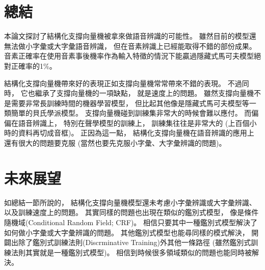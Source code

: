\section{總結}
  本論文探討了結構化支撐向量機被拿來做語音辨識的可能性。 
  雖然目前的模型還無法做小字彙或大字彙語音辨識，
  但在音素辨識上已經能取得不錯的部份成果。
  音素正確率在使用音素事後機率作為輸入特徵的情況下能贏過隱藏式馬可夫模型絕對正確率的1\%。

  結構化支撐向量機帶來好的表現正如支撐向量機常常帶來不錯的表現。
  不過同時，
  它也繼承了支撐向量機的一項缺點，
  就是速度上的問題。
  雖然支撐向量機不是需要非常長訓練時間的機器學習模型，
  但比起其他像是隱藏式馬可夫模型等一類簡單的貝氏學派模型。
  支撐向量機碰到訓練集非常大的時候會難以應付。
  而偏偏在語音辨識上，
  特別在聲學模型的訓練上，
  訓練集往往是非常大的
  (上百個小時的資料再切成音框)。
  正因為這一點，
  結構化支撐向量機在語音辨識的應用上還有很大的問題要克服
  (當然也要先克服小字彙、大字彙辨識的問題)。

\section{未來展望}
  如總結一節所說的，
  結構化支撐向量機模型還未考慮小字彙辨識或大字彙辨識、
  以及訓練速度上的問題。
  其實同樣的問題也出現在類似的鑑別式模型，
  像是條件隨機域(Conditional Random Field; CRF)。
  相信只要其中一種鑑別式模型解決了如何做小字彙或大字彙辨識的問題。
  其他鑑別式模型也能尋同樣的模式解決，
  開闢出除了鑑別式訓練法則(Discrminative Training)外其他一條路徑
  (雖然鑑別式訓練法則其實就是一種鑑別式模型)。
  相信到時候很多領域類似的問題也能同時被解決。
